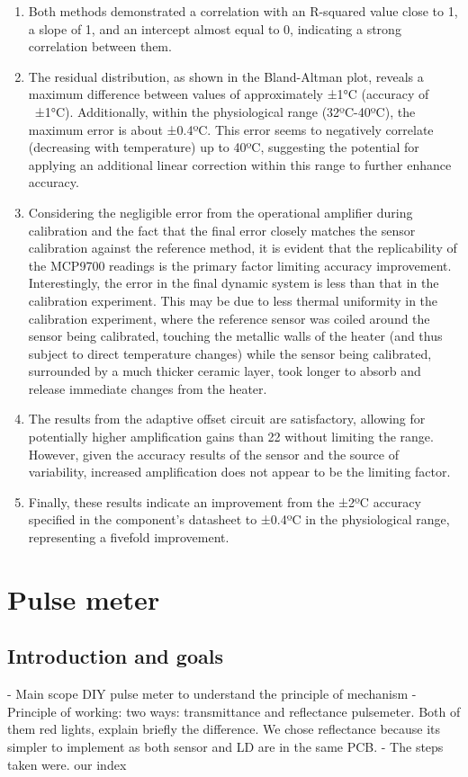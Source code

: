 \documentclass[conference]{IEEEtran}
\begin{document}
      \begin{enumerate}
      \item Both methods demonstrated a correlation with an R-squared value close to 1, a slope of 1, and an intercept almost equal to 0, indicating a strong correlation between them.
      \item The residual distribution, as shown in the Bland-Altman plot, reveals a maximum difference between values of approximately ±1°C (accuracy of ~±1°C). Additionally, within the physiological range (32ºC-40ºC), the maximum error is about ±0.4ºC. This error seems to negatively correlate (decreasing with temperature) up to 40ºC, suggesting the potential for applying an additional linear correction within this range to further enhance accuracy.
      \item Considering the negligible error from the operational amplifier during calibration and the fact that the final error closely matches the sensor calibration against the reference method, it is evident that the replicability of the MCP9700 readings is the primary factor limiting accuracy improvement. 
      Interestingly, the error in the final dynamic system is less than that in the calibration experiment. This may be due to less thermal uniformity in the calibration experiment, 
      where the reference sensor was coiled around the sensor being calibrated, touching the metallic walls of the heater (and thus subject to direct temperature changes) while the 
      sensor being calibrated, surrounded by a much thicker ceramic layer, took longer to absorb and release immediate changes from the heater.
      \item The results from the adaptive offset circuit are satisfactory, allowing for potentially higher amplification gains than 22 without limiting the range. However, given the accuracy results of the sensor and the source of variability, increased amplification does not appear to be the limiting factor.
      \item Finally, these results indicate an improvement from the ±2ºC accuracy specified in the component's datasheet to ±0.4ºC in the physiological range, representing a fivefold improvement. 
      
      \end{enumerate}

\section{Pulse meter} %
   \subsection{Introduction and goals}
    - Main scope DIY pulse meter to understand the principle of mechanism
- Principle of working: two ways: transmittance and reflectance pulsemeter. Both of them red lights, explain briefly the difference. We chose reflectance because its simpler to implement as both sensor and LD are in the 
same PCB.
- The steps taken were. our index
\end{document}
